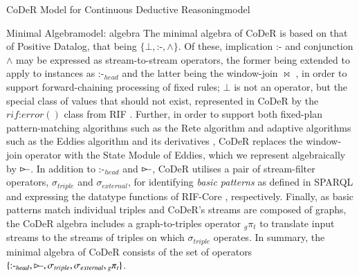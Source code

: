 \begin{nestedsection}{CoDeR Model for Continuous Deductive Reasoning}{model}
	\begin{nestedsection}{Minimal Algebra}{model: algebra}
		The minimal algebra of CoDeR is based on that of Positive Datalog, that being ${\{\bot, \text{:-}, \wedge\}}$.
		Of these, implication $\text{:-}$ and conjunction $\wedge$ may be expressed as stream-to-stream operators, the former being extended to apply to instances as $\text{:-}_{head}$ and the latter being the window-join $\Join$ \citep{niagaraCQ}, in order to support forward-chaining processing of fixed rules;
		$\bot$ is not an operator, but the special class of values that should not exist, represented in CoDeR by the ${rif\text{:}error()}$ class from RIF \citep{w3crif}.
		Further, in order to support both fixed-plan pattern-matching algorithms such as the Rete algorithm \citep{forgy79} and adaptive algorithms such as the Eddies algorithm \citep{eddies} and its derivatives \citep{CACQ,TCQ}, CoDeR replaces the window-join operator with the State Module of Eddies, which we represent algebraically by $\rstreamjoin$.
		In addition to $\text{:-}_{head}$ and $\rstreamjoin$, CoDeR utilises a pair of stream-filter operators, $\sigma_{triple}$ and $\sigma_{external}$, for identifying \emph{basic patterns} as defined in SPARQL \citep{w3csparql} and expressing the datatype functions of RIF-Core \citep{w3crifcore}, respectively.
		Finally, as basic patterns match individual triples and CoDeR's streams are composed of graphs, the CoDeR algebra includes a graph-to-triples operator ${{}_g\pi_t}$ to translate input streams to the streams of triples on which $\sigma_{triple}$ operates.
		In summary, the minimal algebra of CoDeR consists of the set of operators ${\{\text{:-}_{head}, \rstreamjoin, \sigma_{triple}, \sigma_{external}, {}_g{\pi_t}\}}$.


\end{nestedsection}
\end{nestedsection}
